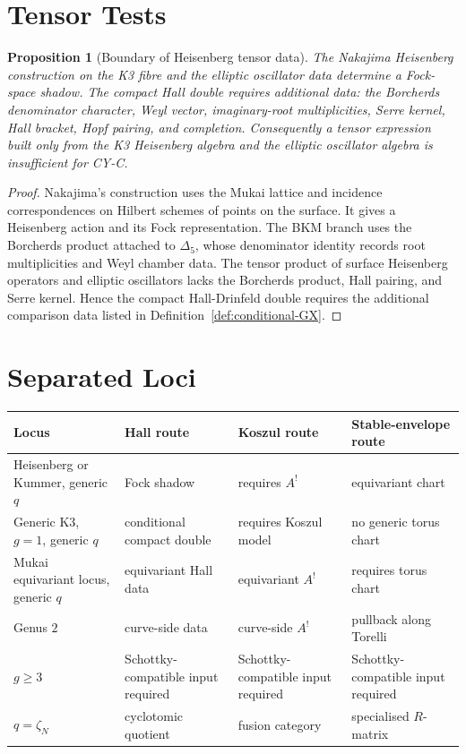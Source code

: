 \documentclass[11pt]{article}
\newtheorem{proposition}[theorem]{Proposition}
\begin{document}
\section{Tensor Tests}
\label{sec:tensor-tests}

\begin{proposition}[Boundary of Heisenberg tensor data]
\label{prop:heisenberg-tensor-boundary}
The Nakajima Heisenberg construction on the K3 fibre and the elliptic
oscillator data determine a Fock-space shadow. The compact Hall double
requires additional data: the Borcherds denominator character, Weyl
vector, imaginary-root multiplicities, Serre kernel, Hall bracket, Hopf
pairing, and completion. Consequently a tensor expression built only
from the K3 Heisenberg algebra and the elliptic oscillator algebra is
insufficient for CY-C.
\end{proposition}

\begin{proof}
Nakajima's construction uses the Mukai lattice and incidence
correspondences on Hilbert schemes of points on the surface. It gives a
Heisenberg action and its Fock representation. The BKM branch uses the
Borcherds product attached to $\Delta_5$, whose denominator identity
records root multiplicities and Weyl chamber data. The tensor product
of surface Heisenberg operators and elliptic oscillators lacks the
Borcherds product, Hall pairing, and Serre kernel. Hence the compact
Hall-Drinfeld double requires the additional comparison data listed in
Definition~\ref{def:conditional-GX}.
\end{proof}

\section{Separated Loci}
\label{sec:separated-loci}

\begin{center}
\renewcommand{\arraystretch}{1.25}
\begin{tabular}{llll}
\toprule
Locus & Hall route & Koszul route & Stable-envelope route \\
\midrule
Heisenberg or Kummer, generic $q$ &
Fock shadow &
requires $A^!$ &
equivariant chart \\
Generic K3, $g=1$, generic $q$ &
conditional compact double &
requires Koszul model &
no generic torus chart \\
Mukai equivariant locus, generic $q$ &
equivariant Hall data &
equivariant $A^!$ &
requires torus chart \\
Genus $2$ &
curve-side data &
curve-side $A^!$ &
pullback along Torelli \\
$g\geq 3$ &
Schottky-compatible input required &
Schottky-compatible input required &
Schottky-compatible input required \\
$q=\zeta_N$ &
cyclotomic quotient &
fusion category &
specialised $R$-matrix \\
\bottomrule
\end{tabular}
\end{center}
\end{document}
